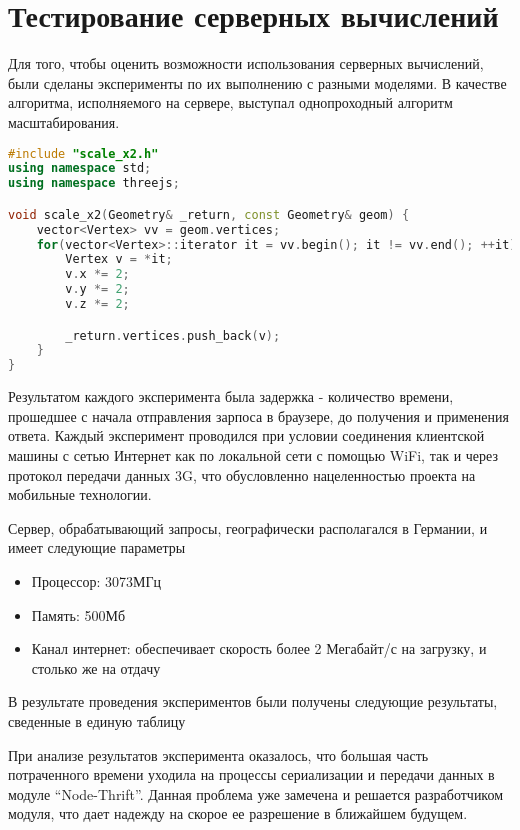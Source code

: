 \section{Тестирование серверных вычислений}

Для того, чтобы оценить возможности использования серверных вычислений, были
сделаны эксперименты по их выполнению с разными моделями. В качестве алгоритма,
исполняемого на сервере, выступал однопроходный алгоритм масштабирования.

\begin{lstlisting}[language=c++]
#include "scale_x2.h"
using namespace std;
using namespace threejs;

void scale_x2(Geometry& _return, const Geometry& geom) {
    vector<Vertex> vv = geom.vertices;
    for(vector<Vertex>::iterator it = vv.begin(); it != vv.end(); ++it) {
        Vertex v = *it;
        v.x *= 2;
        v.y *= 2;
        v.z *= 2;

        _return.vertices.push_back(v);
    }
}
\end{lstlisting}

Результатом каждого эксперимента была задержка - количество времени, прошедшее
с начала отправления зарпоса в браузере, до получения и применения ответа.
Каждый эксперимент проводился при условии соединения клиентской машины с сетью
Интернет как по локальной сети с помощью WiFi, так и через протокол передачи
данных 3G, что обусловленно нацеленностью проекта на мобильные технологии.

Сервер, обрабатывающий запросы, географически располагался в Германии, и имеет
следующие параметры
\begin{itemize}
    \item Процессор: 3073МГц
    \item Память: 500Мб
    \item Канал интернет: обеспечивает скорость более 2 Мегабайт/с на загрузку, и
    столько же на отдачу
\end{itemize}

В результате проведения экспериментов были получены следующие результаты,
сведенные в единую таблицу

\begin{table}[ht]
\caption{Серверные вычисления, 3G}
\begin{center}
\end{center}
\label{table:nonlin}
\end{table}

При анализе результатов эксперимента оказалось, что большая часть потраченного
времени уходила на процессы сериализации и передачи данных в модуле
``Node-Thrift''. Данная проблема уже замечена и решается разработчиком модуля,
что дает надежду на скорое ее разрешение в ближайшем будущем.

